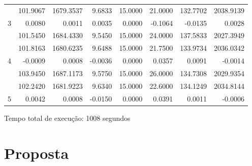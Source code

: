 \begin{table}[htb]
{\begin{tabular}{c|r|r|r|r|r|r|r}
 & 101.9067 & 1679.3537 & 9.6833 & 15.0000 & 21.0000 & 132.7702 & 2038.9139 \\ \cline{2-8} 
\multirow{-3}{*}{3} & \cellcolor[HTML]{ADDDAD}0.0080 & \cellcolor[HTML]{ADDDAD}0.0011 & \cellcolor[HTML]{ADDDAD}0.0035 & \cellcolor[HTML]{ADDDAD}0.0000 & -0.1064 & \cellcolor[HTML]{ADDDAD}-0.0135 & \cellcolor[HTML]{ADDDAD}0.0028 \\ \hline
 & 101.5450 & 1684.4330 & 9.5450 & 15.0000 & 24.0000 & 137.5833 & 2027.3949 \\ \cline{2-8} 
 & 101.8163 & 1680.6235 & 9.6488 & 15.0000 & 21.7500 & 133.9734 & 2036.0342 \\ \cline{2-8} 
\multirow{-3}{*}{4} & \cellcolor[HTML]{ADDDAD}-0.0009 & \cellcolor[HTML]{ADDDAD}0.0008 & \cellcolor[HTML]{ADDDAD}-0.0036 & \cellcolor[HTML]{ADDDAD}0.0000 & \cellcolor[HTML]{ADDDAD}0.0357 & \cellcolor[HTML]{ADDDAD}0.0091 & \cellcolor[HTML]{ADDDAD}-0.0014 \\ \hline
 & 103.9450 & 1687.1173 & 9.5750 & 15.0000 & 26.0000 & 134.7308 & 2029.9354 \\ \cline{2-8} 
 & \cellcolor[HTML]{FFCE93}102.2420 & \cellcolor[HTML]{FFCE93}1681.9223 & \cellcolor[HTML]{FFCE93}9.6340 & \cellcolor[HTML]{FFCE93}15.0000 & \cellcolor[HTML]{FFCE93}22.6000 & \cellcolor[HTML]{FFCE93}134.1249 & \cellcolor[HTML]{FFCE93}2034.8144 \\ \cline{2-8} 
\multirow{-3}{*}{5} & \cellcolor[HTML]{ADDDAD}0.0042 & \cellcolor[HTML]{ADDDAD}0.0008 & \cellcolor[HTML]{ADDDAD}-0.0150 & \cellcolor[HTML]{ADDDAD}0.0000 & \cellcolor[HTML]{ADDDAD}0.0391 & \cellcolor[HTML]{ADDDAD}0.0011 & \cellcolor[HTML]{ADDDAD}-0.0006 \\ \hline
\end{tabular}%
}
\end{table}

Tempo total de execução: 1008 segundos

\pagebreak
\section{Proposta}

